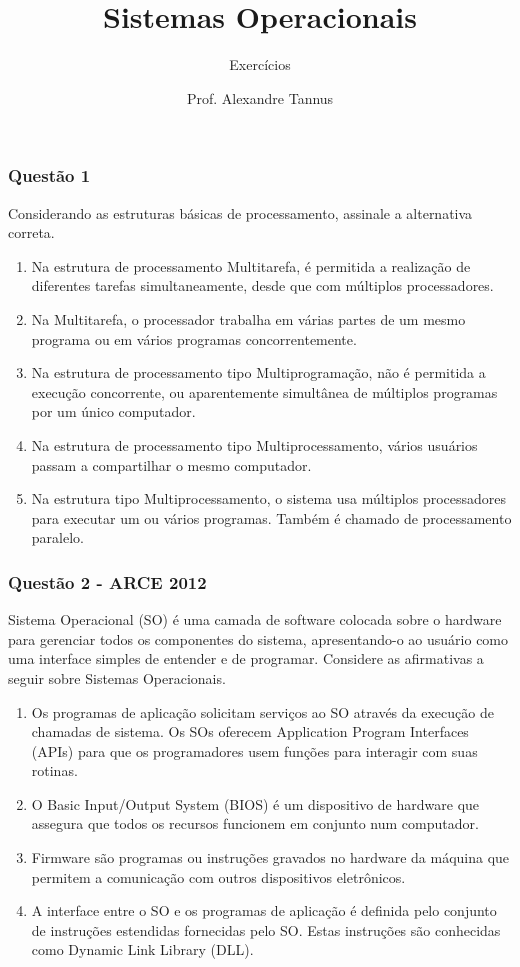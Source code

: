 \documentclass[aspectratio=169,
				xcolor=table]{beamer}
\title[]{Sistemas Operacionais}
\subtitle[]{Exercícios}
\author[]{Prof. Alexandre Tannus}
\date{}
\begin{document}
	\begin{frame}
		\titlepage
	\end{frame}

	\begin{frame}
		\tableofcontents		
	\end{frame}	
	
	\begin{frame}
		\frametitle{Questão 1}
		Considerando as estruturas básicas de processamento, assinale a alternativa correta.
		\begin{enumerate}[a]
			\item Na estrutura de processamento Multitarefa, é permitida a realização de diferentes tarefas simultaneamente, desde que com múltiplos processadores.
			\item Na Multitarefa, o processador trabalha em várias partes de um mesmo programa ou em vários programas concorrentemente.
			\item Na estrutura de processamento tipo Multiprogramação, não é permitida a execução concorrente, ou aparentemente simultânea de múltiplos programas por um único computador.
			\item Na estrutura de processamento tipo Multiprocessamento, vários usuários passam a compartilhar o mesmo computador. 
			\item Na estrutura tipo Multiprocessamento, o sistema usa múltiplos processadores para executar um ou vários programas. Também é chamado de processamento paralelo.		
		\end{enumerate}
	\end{frame}	
	
	\begin{frame}
		\frametitle{Questão 2 - ARCE 2012}
		Sistema Operacional (SO) é uma camada de software colocada sobre o hardware para gerenciar todos os componentes do sistema, apresentando-o ao usuário como uma interface simples de entender e de programar. Considere as afirmativas a seguir sobre Sistemas Operacionais.

	\begin{enumerate}[I]
		\scriptsize
		\item Os programas de aplicação solicitam serviços ao SO através da execução de chamadas de sistema. Os SOs oferecem Application Program Interfaces (APIs) para que os programadores usem funções para interagir com suas rotinas.

		\item O Basic Input/Output System (BIOS) é um dispositivo de hardware que assegura que todos os recursos funcionem em conjunto num computador.

		\item Firmware são programas ou instruções gravados no hardware da máquina que permitem a comunicação com outros dispositivos eletrônicos.

		\item A interface entre o SO e os programas de aplicação é definida pelo conjunto de instruções estendidas fornecidas pelo SO. Estas instruções são conhecidas como Dynamic Link Library (DLL).

	\end{enumerate}

	\end{frame}
	
\end{document}
